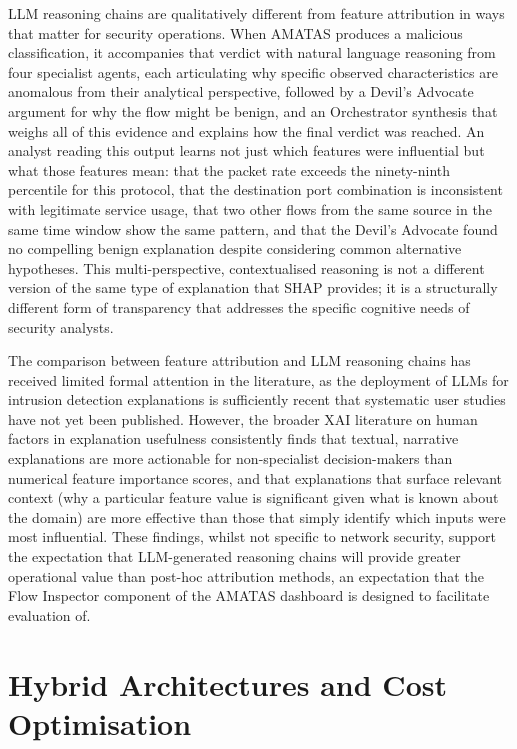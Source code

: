 LLM reasoning chains are qualitatively different from feature attribution in ways that matter for security operations. When AMATAS produces a malicious classification, it accompanies that verdict with natural language reasoning from four specialist agents, each articulating why specific observed characteristics are anomalous from their analytical perspective, followed by a Devil's Advocate argument for why the flow might be benign, and an Orchestrator synthesis that weighs all of this evidence and explains how the final verdict was reached. An analyst reading this output learns not just which features were influential but what those features mean: that the packet rate exceeds the ninety-ninth percentile for this protocol, that the destination port combination is inconsistent with legitimate service usage, that two other flows from the same source in the same time window show the same pattern, and that the Devil's Advocate found no compelling benign explanation despite considering common alternative hypotheses. This multi-perspective, contextualised reasoning is not a different version of the same type of explanation that SHAP provides; it is a structurally different form of transparency that addresses the specific cognitive needs of security analysts.

The comparison between feature attribution and LLM reasoning chains has received limited formal attention in the literature, as the deployment of LLMs for intrusion detection explanations is sufficiently recent that systematic user studies have not yet been published. However, the broader XAI literature on human factors in explanation usefulness \autocite{Lage2019,Chromik2021} consistently finds that textual, narrative explanations are more actionable for non-specialist decision-makers than numerical feature importance scores, and that explanations that surface relevant context (why a particular feature value is significant given what is known about the domain) are more effective than those that simply identify which inputs were most influential. These findings, whilst not specific to network security, support the expectation that LLM-generated reasoning chains will provide greater operational value than post-hoc attribution methods, an expectation that the Flow Inspector component of the AMATAS dashboard is designed to facilitate evaluation of.

\section{Hybrid Architectures and Cost Optimisation}
\label{sec:hybrid-architectures}

